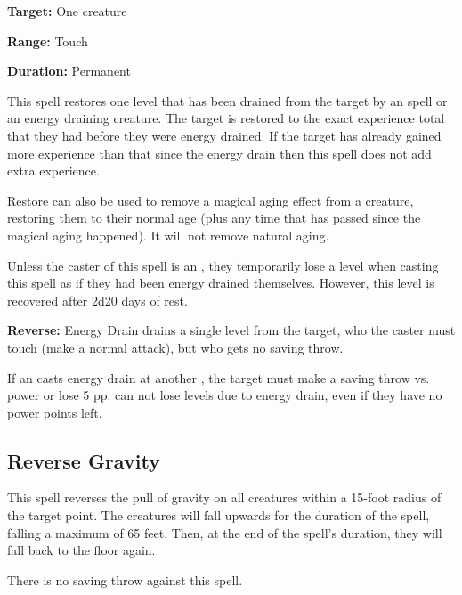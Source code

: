 \begin{multicols*}{2}
{\textbf{Target:} One creature

\textbf{Range:} Touch

\textbf{Duration:} Permanent}

This spell restores one level that has been drained from the target by an  spell or an energy draining creature. The target is restored to the exact experience total that they had before they were energy drained. If the target has already gained more experience than that since the energy drain then this spell does not add extra experience.

Restore can also be used to remove a magical aging effect from a creature, restoring them to their normal age (plus any time that has passed since the magical aging happened). It will not remove natural aging.

Unless the caster of this spell is an , they temporarily lose a level when casting this spell as if they had been energy drained themselves. However, this level is recovered after 2d20 days of rest.

\textbf{Reverse:} \hypertarget{spell:Energy Drain}{Energy Drain} drains a single level from the target, who the caster must touch (make a normal attack), but who gets no saving throw.

If an  casts energy drain at another , the target must make a saving throw vs. power or lose 5 pp.  can not lose levels due to energy drain, even if they have no power points left.

\subsection{Reverse Gravity}\label{spell:Reverse Gravity}

This spell reverses the pull of gravity on all creatures within a 15-foot radius of the target point. The creatures will fall upwards for the duration of the spell, falling a maximum of 65 feet. Then, at the end of the spell’s duration, they will fall back to the floor again.

There is no saving throw against this spell.


\end{multicols*}
